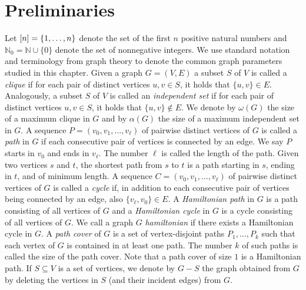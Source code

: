 \section{Preliminaries}
\label{sec:prelim}
Let $[n] = \{ 1, \ldots, n \}$ denote the set of the first $n$ positive natural numbers and $\mathbb{N}_0 = \mathbb{N} \cup \{ 0 \}$ denote the set of nonnegative integers. We use standard notation and terminology from graph theory to denote 
the common graph parameters studied in this chapter. 
Given a graph $G = (V,E)$ a  subset $S$ of $V$ is called a \emph{clique} if 
for each pair of distinct vertices $u,v \in S$, it holds that $\{u,v\} \in E$.
Analogously, a subset $S$ of $V$ is called an \emph{independent set} if for each pair 
of distinct vertices $u,v \in S$, it holds that $\{u,v\} \notin E$.  We denote by $\omega(G)$ the size of a maximum 
clique in $G$ and by $\alpha(G)$ the size of a maximum independent set in $G$.
A sequence $P = (v_0, v_1, \dots, v_{\ell})$ of pairwise distinct vertices of $G$ is called a \emph{path} in $G$ 
if each consecutive pair of vertices is connected by an edge.
We say $P$ starts in $v_0$ and ends in $v_{\ell}$. The number $\ell$ is called the length of the path. Given two vertices $s$ and $t$, 
the shortest path from $s$ to $t$ is a path starting in $s$, ending in $t$, and
of minimum length.
A sequence $C = (v_0, v_1, \dots, v_{\ell})$ of pairwise distinct vertices of $G$
is called a \emph{cycle} if, in addition to each consecutive pair of vertices being connected by an edge, 
also $\{v_{\ell}, v_0\} \in E$. A \emph{Hamiltonian path} in $G$ is a path consisting of all vertices of $G$
and a \emph{Hamiltonian cycle} in $G$ is a cycle consisting of all vertices of $G$. We 
call a graph $G$ \emph{hamiltonian} if there exists a Hamiltonian cycle in $G$.
A \emph{path cover} of $G$ is a set of vertex-disjoint paths $P_1, \dots, P_k$ 
such that each vertex of $G$ is contained in at least one path. The number $k$ of 
such paths is called the size of the path cover. Note that a path cover of size $1$ 
is a Hamiltonian path. If $S \subseteq V$ is a set of vertices, we denote by $G-S$ the graph obtained from $G$
by deleting the vertices in $S$ (and their incident edges) from $G$.

